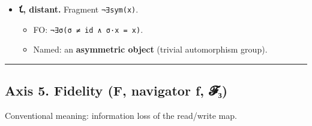 \documentclass[12pt,a4paper]{article}
\begin{document}
\begin{itemize}
  \begin{itemize}
  \tightlist
  \item
    FO: \texttt{(∀g\ ∈\ G)(g·x\ =\ x)}.
  \item
    Named: a \textbf{G-invariant / fixed point of the group action}
    (full stabilizer).
  \end{itemize}
\item
  \textbf{𐑗, distant.} Fragment \texttt{¬∃sym(x)}.

  \begin{itemize}
  \tightlist
  \item
    FO: \texttt{¬∃σ(σ\ ≠\ id\ ∧\ σ·x\ =\ x)}.
  \item
    Named: an \textbf{asymmetric object} (trivial automorphism group).
  \end{itemize}
\end{itemize}

\begin{center}\rule{0.5\linewidth}{0.5pt}\end{center}

\hypertarget{axis-5.-fidelity-f-navigator-ux192-ux1d4d5ux2083}{%
\subsection{Axis 5. Fidelity (F, navigator ƒ,
𝓕₃)}\label{axis-5.-fidelity-f-navigator-ux192-ux1d4d5ux2083}}

Conventional meaning: information loss of the read/write map.
\end{document}
